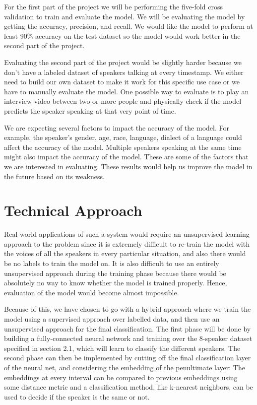 \documentclass[10pt,twocolumn,letterpaper]{article}
\begin{document}
For the first part of the project we will be performing the five-fold cross validation to train and evaluate the model. We will be evaluating the model by getting the accuracy, precision, and recall. We would like the model to perform at least 90\% accuracy on the test dataset so the model would work better in the second part of the project. 

Evaluating the second part of the project would be slightly harder because we don’t have a labeled dataset of speakers talking at every timestamp. We either need to build our own dataset to make it work for this specific use case or we have to manually evaluate the model. One possible way to evaluate is to play an interview video between two or more people and physically check if the model predicts the speaker speaking at that very point of time. 

We are expecting several factors to impact the accuracy of the model. For example, the speaker’s gender, age, race, language, dialect of a language could affect the accuracy of the model. Multiple speakers speaking at the same time might also impact the accuracy of the model. These are some of the factors that we are interested in evaluating. These results would help us improve the model in the future based on its weakness. 


\section{Technical Approach}

Real-world applications of such a system would require an unsupervised learning approach to the problem since it is extremely difficult to re-train the model with the voices of all the speakers in every particular situation, and also there would be no labels to train the model on. It is also difficult to use an entirely unsupervised approach during the training phase because there would be absolutely no way to know whether the model is trained properly. Hence, evaluation of the model would become almost impossible. 

Because of this, we have chosen to go with a hybrid approach where we train the model using a supervised approach over labelled data, and then use an unsupervised approach for the final classification. The first phase will be done by building a fully-connected neural network and training over the 8-speaker dataset specified in section 2.1, which will learn to classify the different speakers. The second phase can then be implemented by cutting off the final classification layer of the neural net, and considering the embedding of the penultimate layer: The embeddings at every interval can be compared to previous embeddings using some distance metric and a classification method, like k-nearest neighbors, can be used to decide if the speaker is the same or not. 
\end{document}
